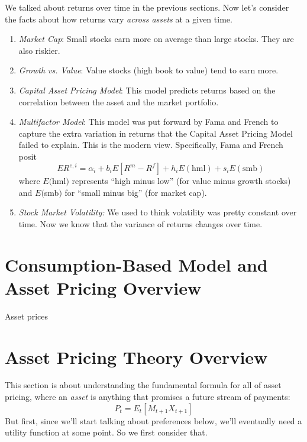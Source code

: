 \documentclass[a4paper,12pt]{scrartcl}
\begin{document}
We talked about returns over time in the previous sections. Now
let's consider the facts about how returns vary \emph{across assets}
at a given time.
\begin{enumerate}
    \item {\sl Market Cap}: Small stocks earn more on average than
	large stocks.  They are also riskier.
    \item {\sl Growth vs. Value}: Value stocks (high book to value)
	tend to earn more.
    \item {\sl Capital Asset Pricing Model}: This model predicts
	returns based on the correlation between the asset and
	the market portfolio.
    \item {\sl Multifactor Model}: This model was put forward by
	Fama and French to capture the extra variation in returns
	that the Capital Asset Pricing Model failed to explain.
	This is the modern view. Specifically, Fama and French posit
	\begin{equation}
	    \label{ff3fm}
	    ER^{e,i} = \alpha_i + b_iE[R^m - R^f] + h_i E(\text{hml})
		+ s_i E(\text{smb})
	\end{equation}
	where $E($hml$)$ represents ``high minus low'' (for
	value minus growth stocks)
	and $E($smb$)$ for ``small minus big'' (for market cap).
    \item {\sl Stock Market Volatility:} We used to think volatility
	was pretty constant over time.  Now we know that the
	variance of returns changes over time.
\end{enumerate}

\clearpage
\section{Consumption-Based Model and Asset Pricing Overview}

Asset prices

\newpage
\section{Asset Pricing Theory Overview}

This section is about understanding the fundamental formula for
all of asset pricing, where an \emph{asset} is anything
that promises a future stream of payments:
\begin{equation}
    \label{pemx}
    P_t = E_t[M_{t+1} X_{t+1}]
\end{equation}
But first, since we'll start talking about preferences below,
we'll eventually need a utility function at some point. So we
first consider that.
\end{document}
